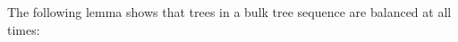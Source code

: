 \documentclass[10pt, conference, compsocconf]{IEEEtran}
\newcommand{\Oh}{\mathcal{O}}
\let\le\leqslant
\let\leq\leqslant
\let\geq\geqslant
\newcommand{\itemref}[1]{(\ref{#1})}
\begin{document}


The following lemma shows that trees in a bulk tree sequence are balanced at all times:
\end{document}
